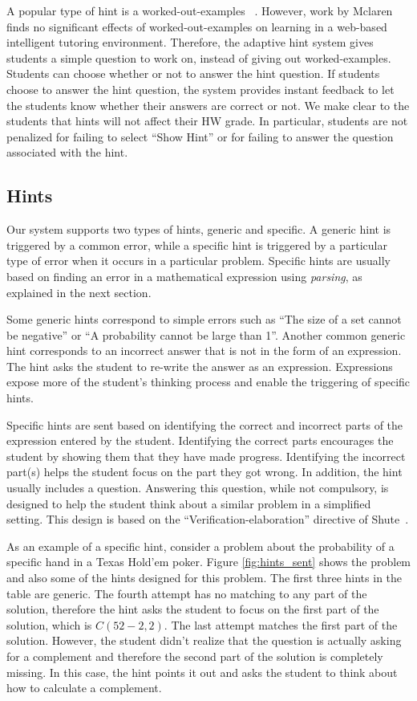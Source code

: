 \documentclass{llncs2e/llncs}
\begin{document}
A popular type of hint is a worked-out-examples ~\cite{Atkinson2000}. However, work by
Mclaren~\cite{McLaren2006} finds no significant effects of worked-out-examples on learning in a web-based intelligent tutoring environment. Therefore, the adaptive hint system gives students a simple question to work on, instead of giving out worked-examples. Students can choose whether or not to answer the hint question. If students choose to answer the hint question, the system provides instant feedback to let the students know whether their answers are correct or not. We make clear to the students that hints will not affect their HW grade. In particular, students are not penalized for failing to select ``Show Hint'' or for failing to answer the question associated with the hint.

\subsection*{Hints}

Our system supports two types of hints, generic and specific. A generic hint is triggered by a common error, while a specific hint is triggered by a particular type of error when it occurs in a particular problem. Specific hints are usually based on finding an error in a mathematical expression using {\em parsing}, as explained in the next section.

Some generic hints correspond to simple errors such as ``The size of a set cannot be negative'' or ``A probability cannot be large than 1''. Another common generic hint corresponds to an incorrect answer that is not in the form of an expression. The hint asks the student to re-write the answer as an expression.  Expressions expose more of the student's thinking process and enable the triggering of specific hints.

Specific hints are sent based on identifying the correct and incorrect parts of the expression entered by the student. Identifying the correct parts encourages the student by showing them that they have made progress. Identifying the incorrect part(s) helps the student focus on the part they got wrong. In addition, the hint usually includes a question. Answering this question, while not compulsory, is designed to help the student think about a similar problem in a simplified setting. This design is based on the ``Verification-elaboration'' directive of Shute~\cite{Shute2008}.

As an example of a specific hint, consider a problem about the probability of a specific hand in a Texas Hold'em poker. Figure \ref{fig:hints_sent} shows the problem and also some of the hints designed for this problem. The first three hints in the table are generic. The fourth attempt has no matching to any part of the solution, therefore the hint asks the student to focus on the first part of the solution, which is $C(52-2,2)$. The last attempt matches the first part of the solution. However, the student didn't realize that the question is actually asking for a complement and therefore the second part of the solution is completely missing. In this case, the hint points it out and asks the student to think about how to calculate a complement.
\end{document}
